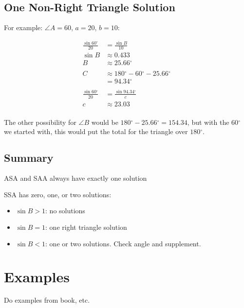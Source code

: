 \documentclass{exam}
\newcommand{\dg}{\ensuremath{^\circ}}
\begin{document}
  \subsection{One Non-Right Triangle Solution}
  For example: $\angle A = 60$, $a = 20$, $b = 10$:

  \begin{align*}
    \frac{\sin 60 \dg}{20} & = \frac{\sin B}{10} \\
    \sin B                & \approx 0.433\\
    B                     & \approx 25.66 \dg \\
    \\
    C                     & \approx 180 \dg - 60 \dg - 25.66 \dg \\
                          & = 94.34 \dg \\
    \\
    \frac{\sin 60 \dg}{20} & = \frac{\sin 94.34 \dg}{c} \\
    c                     & \approx 23.03 \\
  \end{align*}

  The other possibility for $\angle B$ would be $180 \dg - 25.66 \dg = 154.34$, but with the $60 \dg$ we started with,
  this would put the total for the triangle over $180 \dg$.

  \subsection{Summary}
  \begin{itemize*}
    \item ASA and SAA always have exactly one solution

    \item SSA has zero, one, or two solutions:
      \begin{itemize}
        \item $\sin B > 1$: no solutions
        \item $\sin B = 1$: one right triangle solution
        \item $\sin B < 1$: one or two solutions.  Check angle and supplement.
      \end{itemize}

  \end{itemize*}

  \section{Examples}
  Do examples from book, etc.
\end{document}

